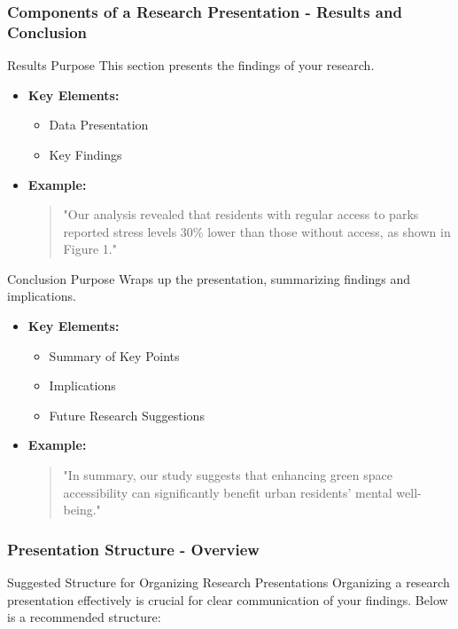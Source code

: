 \documentclass[aspectratio=169]{beamer}
\begin{document}
\begin{frame}[fragile]
    \frametitle{Components of a Research Presentation - Results and Conclusion}
    \begin{block}{Results Purpose}
        This section presents the findings of your research.
    \end{block}
    \begin{itemize}
        \item \textbf{Key Elements:}
            \begin{itemize}
                \item Data Presentation
                \item Key Findings
            \end{itemize}
        \item \textbf{Example:} 
            \begin{quote}
                "Our analysis revealed that residents with regular access to parks reported stress levels 30\% lower than those without access, as shown in Figure 1."
            \end{quote}
    \end{itemize}
    
    \begin{block}{Conclusion Purpose}
        Wraps up the presentation, summarizing findings and implications.
    \end{block}
    \begin{itemize}
        \item \textbf{Key Elements:}
            \begin{itemize}
                \item Summary of Key Points
                \item Implications
                \item Future Research Suggestions
            \end{itemize}
        \item \textbf{Example:} 
            \begin{quote}
                "In summary, our study suggests that enhancing green space accessibility can significantly benefit urban residents' mental well-being."
            \end{quote}
    \end{itemize}
\end{frame}

\begin{frame}[fragile]
    \frametitle{Presentation Structure - Overview}
    \begin{block}{Suggested Structure for Organizing Research Presentations}
        Organizing a research presentation effectively is crucial for clear communication of your findings. Below is a recommended structure:
    \end{block}
\end{frame}
\end{document}
